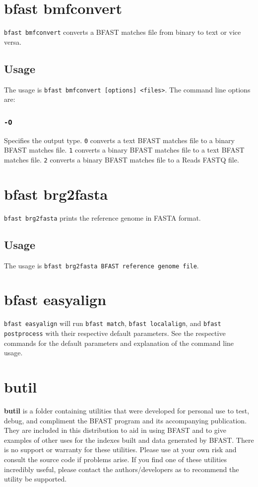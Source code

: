 \documentclass[a4paper,12pt]{book}
\newcommand{\TT}[1]{{\tt #1}} %
\newcommand{\BF}[1]{{\bf #1}} %
\newcommand{\RFF}{Reads FASTQ file}
\newcommand{\BRGF}{BFAST reference genome file} %
\newcommand{\BMF}{BFAST matches file} %
\begin{document}
\section{bfast bmfconvert}
\label{sec:bmfconvert}
\TT{bfast bmfconvert} converts a \BMF{} from binary to text or vice versa.
\subsection{Usage}
The usage is \TT{bfast bmfconvert [options] <files>}.
The command line options are:
\subsubsection{\TT{-O}}
Specifies the output type.
\TT{0} converts a text \BMF{} to a binary \BMF{}.
\TT{1} converts a binary \BMF{} to a text \BMF{}.
\TT{2} converts a binary \BMF{} to a \RFF{}.

\section{bfast brg2fasta}
\label{sec:brg2fasta}
\TT{bfast brg2fasta} prints the reference genome in FASTA format.
\subsection{Usage}
The usage is \TT{bfast brg2fasta \BRGF{}}.
\section{bfast easyalign}
\label{sec:easyalign}
\TT{bfast easyalign} will run \TT{bfast match}, \TT{bfast localalign}, and \TT{bfast postprocess} with their respective default parameters. 
See the respective commands for the default parameters and explanation of the command line usage.
\section{butil}
\label{sec:butil}
\BF{butil} is a folder containing utilities that were developed for personal use to test, debug, and compliment the BFAST program and its accompanying publication.  
They are included in this distribution to aid in using BFAST and to give examples of other uses for the indexes built and data generated by BFAST.
There is no support or warranty for these utilities.  
Please use at your own risk and consult the source code if problems arise.  
If you find one of these utilities incredibly useful, please contact the authors/developers as to recommend the utility be supported.
\end{document}
